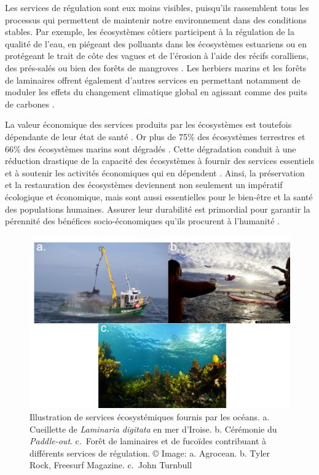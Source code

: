 \begin{refsection}
Les services de régulation sont eux moins visibles, puisqu'ils
rassemblent tous les processus qui permettent de maintenir notre
environnement dans des conditions stables. Par exemple, les écosystèmes
côtiers participent à la régulation de la qualité de l'eau, en piégeant
des polluants dans les écosystèmes estuariens \autocite{Barbier_2011} ou
en protégeant le trait de côte des vagues et de l'érosion à l'aide des
récifs coralliens, des prés-salés ou bien des forêts de mangroves
\autocites[ ]{Barbier_2011}{Harris_2018}. Les herbiers marins et les
forêts de laminaires offrent également d'autres services en permettant
notamment de moduler les effets du changement climatique global en
agissant comme des puits de carbones \autocites[
]{Fourqurean_2012}{Filbee-Dexter_2018}.

La valeur économique des services produits par les écosystèmes est
toutefois dépendante de leur état de santé \autocite{Sutton_2016}. Or
plus de 75\% des écosystèmes terrestres et 66\% des écosystèmes marins
sont dégradés \autocite{ipbes_2019}. Cette dégradation conduit à une
réduction drastique de la capacité des écosystèmes à fournir des
services essentiels et à soutenir les activités économiques qui en
dépendent \autocite{ipbes_2019}. Ainsi, la préservation et la
restauration des écosystèmes deviennent non seulement un impératif
écologique et économique, mais sont aussi essentielles pour le bien-être
et la santé des populations humaines. Assurer leur durabilité est
primordial pour garantir la pérennité des bénéfices socio-économiques
qu'ils procurent à l'humanité \autocite{ipbes_2019}.

\begin{figure}
\hypertarget{fig:intro2}{%
\centering
\includegraphics{02-Introduction/figures/ecosystem_services.png}
\caption[Illustration de services écosystémiques fournis par les océans]{Illustration de services écosystémiques fournis par les océans.
a. Cueillette de \emph{Laminaria digitata} en mer d'Iroise. b. Cérémonie
du \emph{Paddle-out}. c.~Forêt de laminaires et de fucoïdes contribuant
à différents services de régulation. © Image: a. Agrocean. b. Tyler
Rock, Freesurf Magazine. c.~John Turnbull}\label{fig:intro2}
}
\end{figure}


\end{refsection}
